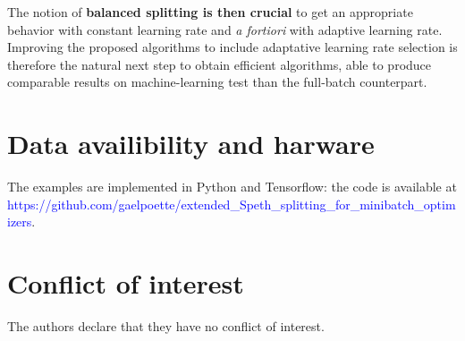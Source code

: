 \documentclass[article,authoryear,jmlmc]{beg_32}             %
\begin{document}
The notion of \textbf{balanced splitting is then crucial} to get an appropriate behavior with constant learning rate and {\em a fortiori} with adaptive learning rate. Improving the
proposed algorithms to include adaptative learning rate selection is therefore the natural next step to obtain efficient algorithms, able to produce comparable results on
machine-learning test than the full-batch counterpart. %



\section*{Data availibility and harware}
The examples are implemented in Python and Tensorflow: the code is available at \textcolor{blue} {https://github.com/gaelpoette/extended\_Speth\_splitting\_for\_minibatch\_optimizers}. 

\section*{Conflict of interest}
The authors declare that they have no conflict of interest.

\newpage

%




\appendix
\end{document}

